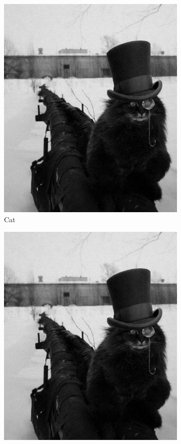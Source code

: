 \begin{figure}[h!]
  \centering
  \begin{subfigure}[b]{0.4\linewidth}
    \includegraphics[width=\linewidth]{figures/cat_picture.jpg}
    \caption{Cat}
  \end{subfigure}
  \begin{subfigure}[b]{0.4\linewidth}
    \includegraphics[width=\linewidth]{figures/cat_picture.jpg}

\end{subfigure}
\end{figure}
